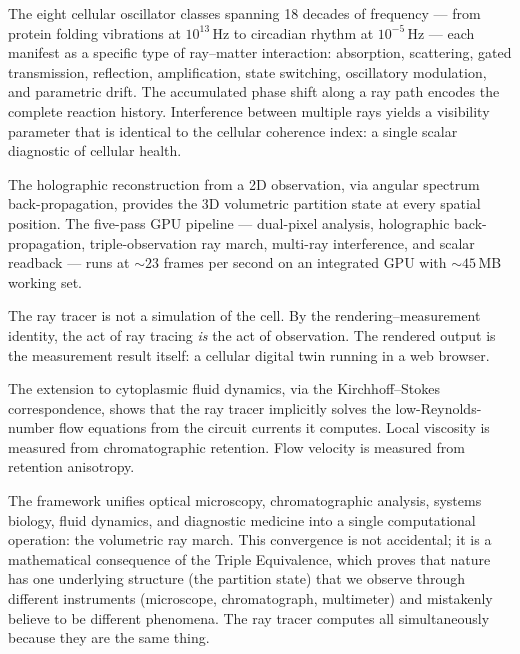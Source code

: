 \documentclass[11pt,twocolumn,a4paper]{article}
\begin{document}
The eight cellular oscillator classes spanning 18 decades of frequency
--- from protein folding vibrations at $10^{13}$\,Hz to circadian
rhythm at $10^{-5}$\,Hz --- each manifest as a specific type of
ray--matter interaction: absorption, scattering, gated transmission,
reflection, amplification, state switching, oscillatory modulation,
and parametric drift. The accumulated phase shift along a ray path
encodes the complete reaction history. Interference between multiple
rays yields a visibility parameter that is identical to the cellular
coherence index: a single scalar diagnostic of cellular health.

The holographic reconstruction from a 2D observation, via angular
spectrum back-propagation, provides the 3D volumetric partition state
at every spatial position. The five-pass GPU pipeline --- dual-pixel
analysis, holographic back-propagation, triple-observation ray march,
multi-ray interference, and scalar readback --- runs at
$\sim\!23$ frames per second on an integrated GPU with
$\sim\!45$\,MB working set.

The ray tracer is not a simulation of the cell. By the
rendering--measurement identity, the act of ray tracing \emph{is} the
act of observation. The rendered output is the measurement result
itself: a cellular digital twin running in a web browser.

The extension to cytoplasmic fluid dynamics, via the Kirchhoff--Stokes
correspondence, shows that the ray tracer implicitly solves the
low-Reynolds-number flow equations from the circuit currents it
computes. Local viscosity is measured from chromatographic retention.
Flow velocity is measured from retention anisotropy.

The framework unifies optical microscopy, chromatographic analysis,
systems biology, fluid dynamics, and diagnostic medicine into a single
computational operation: the volumetric ray march. This convergence is
not accidental; it is a mathematical consequence of the Triple
Equivalence, which proves that nature has one underlying structure
(the partition state) that we observe through different instruments
(microscope, chromatograph, multimeter) and mistakenly believe to be
different phenomena. The ray tracer computes all simultaneously because
they are the same thing.





\end{document}

